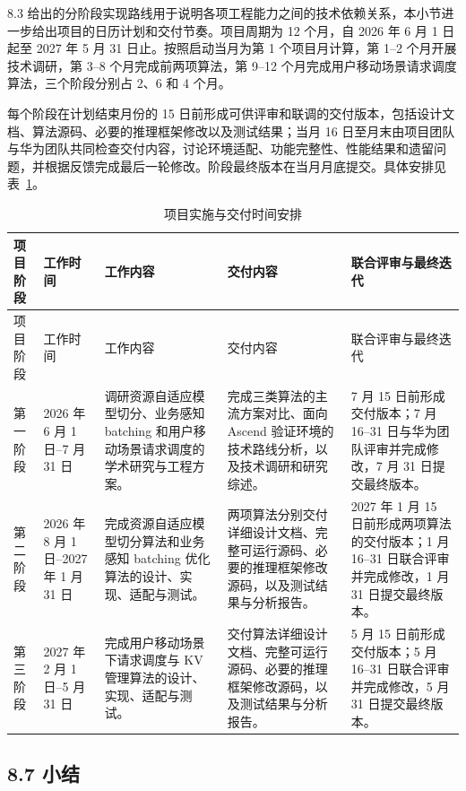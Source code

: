 8.3 给出的分阶段实现路线用于说明各项工程能力之间的技术依赖关系，本小节进一步给出项目的日历计划和交付节奏。项目周期为 12 个月，自 2026 年 6 月 1 日起至 2027 年 5 月 31 日止。按照启动当月为第 1 个项目月计算，第 1--2 个月开展技术调研，第 3--8 个月完成前两项算法，第 9--12 个月完成用户移动场景请求调度算法，三个阶段分别占 2、6 和 4 个月。

每个阶段在计划结束月份的 15 日前形成可供评审和联调的交付版本，包括设计文档、算法源码、必要的推理框架修改以及测试结果；当月 16 日至月末由项目团队与华为团队共同检查交付内容，讨论环境适配、功能完整性、性能结果和遗留问题，并根据反馈完成最后一轮修改。阶段最终版本在当月月底提交。具体安排见表~\ref{tab:ch8-delivery-schedule}。

\begingroup
\footnotesize
\setlength{\LTpre}{6pt}
\setlength{\LTpost}{6pt}
\setlength{\tabcolsep}{3pt}
\begin{longtable}{@{}p{}p{}p{}p{}p{}@{}}
\caption{项目实施与交付时间安排}
\label{tab:ch8-delivery-schedule}\\
\toprule
项目阶段 & 工作时间 & 工作内容 & 交付内容 & 联合评审与最终迭代 \\
\midrule
\endfirsthead
\toprule
项目阶段 & 工作时间 & 工作内容 & 交付内容 & 联合评审与最终迭代 \\
\midrule
\endhead
第一阶段
& 2026 年 6 月 1 日--7 月 31 日
& 调研资源自适应模型切分、业务感知 batching 和用户移动场景请求调度的学术研究与工程方案。
& 完成三类算法的主流方案对比、面向 Ascend 验证环境的技术路线分析，以及技术调研和研究综述。
& 7 月 15 日前形成交付版本；7 月 16--31 日与华为团队评审并完成修改，7 月 31 日提交最终版本。\\
\tabrowrule
第二阶段
& 2026 年 8 月 1 日--2027 年 1 月 31 日
& 完成资源自适应模型切分算法和业务感知 batching 优化算法的设计、实现、适配与测试。
& 两项算法分别交付详细设计文档、完整可运行源码、必要的推理框架修改源码，以及测试结果与分析报告。
& 2027 年 1 月 15 日前形成两项算法的交付版本；1 月 16--31 日联合评审并完成修改，1 月 31 日提交最终版本。\\
\tabrowrule
第三阶段
& 2027 年 2 月 1 日--5 月 31 日
& 完成用户移动场景下请求调度与 KV 管理算法的设计、实现、适配与测试。
& 交付算法详细设计文档、完整可运行源码、必要的推理框架修改源码，以及测试结果与分析报告。
& 5 月 15 日前形成交付版本；5 月 16--31 日联合评审并完成修改，5 月 31 日提交最终版本。\\
\bottomrule
\end{longtable}
\endgroup

\subsection*{8.7 小结}

